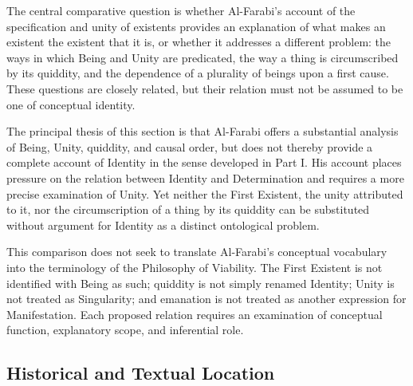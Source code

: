 \label{para:VS.B01.P01.C08.S12.SS01.P003}

The central comparative question is whether Al-Farabi's
account of the specification and unity of existents
provides an explanation of what makes an existent the
existent that it is, or whether it addresses a different
problem: the ways in which Being and Unity are predicated,
the way a thing is circumscribed by its quiddity, and
the dependence of a plurality of beings upon a first cause.
These questions are closely related, but their relation
must not be assumed to be one of conceptual identity.

\label{para:VS.B01.P01.C08.S12.SS01.P004}

The principal thesis of this section is that Al-Farabi
offers a substantial analysis of Being, Unity, quiddity,
and causal order, but does not thereby provide a complete
account of Identity in the sense developed in Part I.
His account places pressure on the relation between
Identity and Determination and requires a more precise
examination of Unity. Yet neither the First Existent,
the unity attributed to it, nor the circumscription of
a thing by its quiddity can be substituted without
argument for Identity as a distinct ontological problem.

\label{para:VS.B01.P01.C08.S12.SS01.P005}

This comparison does not seek to translate Al-Farabi's
conceptual vocabulary into the terminology of the
Philosophy of Viability. The First Existent is not
identified with Being as such; quiddity is not simply
renamed Identity; Unity is not treated as Singularity;
and emanation is not treated as another expression
for Manifestation. Each proposed relation requires
an examination of conceptual function, explanatory
scope, and inferential role.



\subsection{Historical and Textual Location}
\label{subsec:ch08-farabi-historical}

\label{para:VS.B01.P01.C08.S12.SS02.P001}

